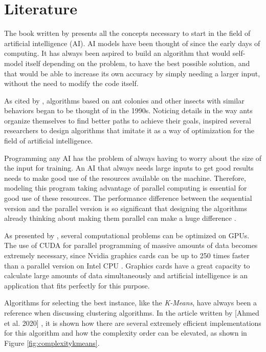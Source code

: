 \section{Literature}

The book written by \cite{BookIA} presents all the concepts necessary to start in the field of artificial intelligence (AI).
AI models have been thought of since the early days of computing. It has always been aspired to build an algorithm
that would self-model itself depending on the problem, to have the best possible solution,
and that would be able to increase its own accuracy by simply needing a larger input, without the need to modify
the code itself.

As cited by \cite{AntColonyOptimization}, algorithms based on ant colonies
and other insects with similar behaviors began to be thought of in the 1990s.
Noticing details in the way ants organize themselves to find better
paths to achieve their goals, inspired several researchers to design algorithms that imitate it as a way
of optimization for the field of artificial intelligence.

Programming any AI has the problem of always having to worry about the size of the input for training.
An AI that always needs large inputs to get good results needs to make good use of the resources available on the machine.
Therefore, modeling this program taking advantage of parallel computing is essential for good use of these resources.
The performance difference between the sequential version and the parallel version is so significant that designing the algorithms
already thinking about making them parallel can make a huge difference \cite{SequentialVSParallel}.

As presented by \cite{ParallelComputingCUDA}, several computational problems can be optimized on GPUs.
The use of CUDA for parallel programming of massive amounts of data becomes extremely necessary, since
Nvidia graphics cards can be up to 250 times faster than a parallel version on Intel CPU \cite{ParallelComputingCUDA}.
Graphics cards have a great capacity to calculate large amounts of data simultaneously and artificial intelligence
is an application that fits perfectly for this purpose.

Algorithms for selecting the best instance, like the \emph{K-Means}, have always been a reference when discussing clustering algorithms. In the article written by [Ahmed et al. 2020] \cite{KmeansAlgorithm},
it is shown how there are several extremely efficient implementations for this algorithm and how the complexity order can be elevated, as shown in Figure \ref{fig:complexitykmeans}.

